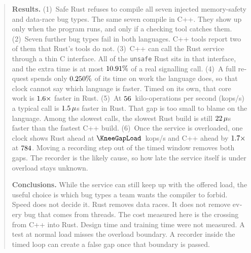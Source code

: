 \documentclass[english,oneside,a4paper,censored,csm,software-track-2020]{HYthesisML}
\begin{document}
{\begin{otherlanguage}{english}
\begin{abstract}
      \noindent\textbf{Results.}
      (1)~Safe Rust refuses to compile all seven injected memory-safety and data-race bug types.
      The same seven compile in C++. They show up only when the program runs, and only if a checking tool catches them.
      (2)~Seven further bug types fail in both languages. C++ tools report two of them that Rust's tools do not.
      (3)~C++ can call the Rust service through a thin C interface.
      All of the \texttt{unsafe} Rust sits in that interface, and the extra time is at most $\FfiOpBoundPct\%$ of a real signalling call.
      (4)~A full request spends only $\BudgetCoreShareMax\%$ of its time on work the language does, so that clock cannot say which language is faster.
      Timed on its own, that core work is $\BudgetCoreRatio\times$ faster in Rust.
      (5)~At $\ReprLoad$~kilo-operations per second (kops/s) a typical call is $\PFiftyDiffAbsMax\,\mu$s faster in Rust.
      That gap is too small to blame on the language.
      Among the slowest calls, the slowest Rust build is still $\FarTailLangSep\,\mu$s faster than the fastest C++ build.
      (6)~Once the service is overloaded, one clock shows Rust ahead at $\KneeGapLoad$~kops/s and C++ ahead by $\OverloadThrRatio\times$ at $\OverloadLoad$.
      Moving a recording step out of the timed window removes both gaps.
      The recorder is the likely cause, so how late the service itself is under overload stays unknown.

      \noindent\textbf{Conclusions.}
      While the service can still keep up with the offered load, the useful choice is which bug types a team wants the compiler to forbid.
      Speed does not decide it.
      Rust removes data races. It does not remove every bug that comes from threads.
      The cost measured here is the crossing from C++ into Rust. Design time and training time were not measured.
      A test at normal load misses the overload boundary.
      A recorder inside the timed loop can create a false gap once that boundary is passed.
\end{abstract}
\end{otherlanguage}
}

\cleardoublepage
{}
\setcounter{page}{1}
\tableofcontents

\cleardoublepage
{}
{}
\listoffigures

\cleardoublepage
{}
{}
\listoftables

\cleardoublepage
{}
{}
\end{document}
